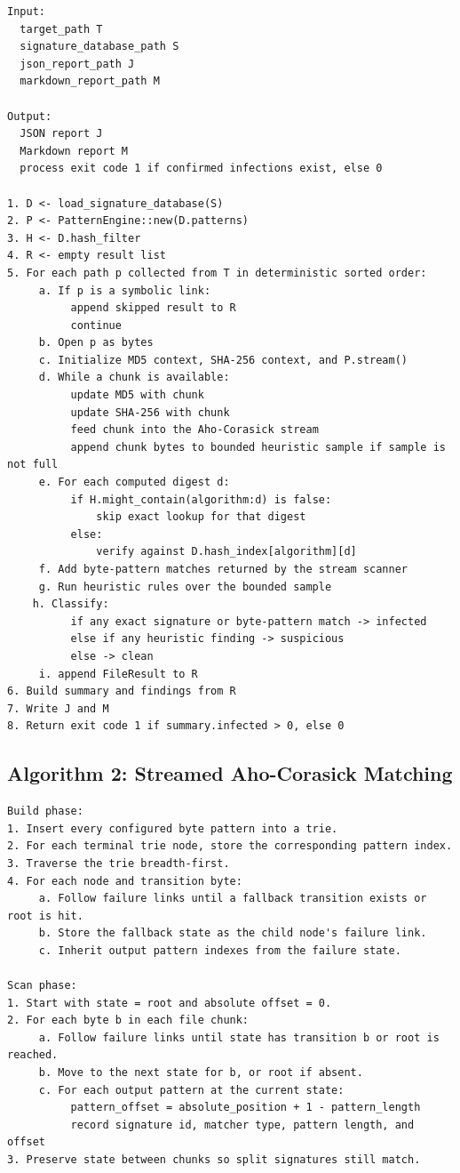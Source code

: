 \documentclass[11pt]{article}
\begin{document}
\begin{lstlisting}[style=sentinel]
Input:
  target_path T
  signature_database_path S
  json_report_path J
  markdown_report_path M

Output:
  JSON report J
  Markdown report M
  process exit code 1 if confirmed infections exist, else 0

1. D <- load_signature_database(S)
2. P <- PatternEngine::new(D.patterns)
3. H <- D.hash_filter
4. R <- empty result list
5. For each path p collected from T in deterministic sorted order:
     a. If p is a symbolic link:
          append skipped result to R
          continue
     b. Open p as bytes
     c. Initialize MD5 context, SHA-256 context, and P.stream()
     d. While a chunk is available:
          update MD5 with chunk
          update SHA-256 with chunk
          feed chunk into the Aho-Corasick stream
          append chunk bytes to bounded heuristic sample if sample is not full
     e. For each computed digest d:
          if H.might_contain(algorithm:d) is false:
              skip exact lookup for that digest
          else:
              verify against D.hash_index[algorithm][d]
     f. Add byte-pattern matches returned by the stream scanner
     g. Run heuristic rules over the bounded sample
    h. Classify:
          if any exact signature or byte-pattern match -> infected
          else if any heuristic finding -> suspicious
          else -> clean
     i. append FileResult to R
6. Build summary and findings from R
7. Write J and M
8. Return exit code 1 if summary.infected > 0, else 0
\end{lstlisting}

\subsection{Algorithm 2: Streamed Aho-Corasick Matching}

\begin{lstlisting}[style=sentinel]
Build phase:
1. Insert every configured byte pattern into a trie.
2. For each terminal trie node, store the corresponding pattern index.
3. Traverse the trie breadth-first.
4. For each node and transition byte:
     a. Follow failure links until a fallback transition exists or root is hit.
     b. Store the fallback state as the child node's failure link.
     c. Inherit output pattern indexes from the failure state.

Scan phase:
1. Start with state = root and absolute offset = 0.
2. For each byte b in each file chunk:
     a. Follow failure links until state has transition b or root is reached.
     b. Move to the next state for b, or root if absent.
     c. For each output pattern at the current state:
          pattern_offset = absolute_position + 1 - pattern_length
          record signature id, matcher type, pattern length, and offset
3. Preserve state between chunks so split signatures still match.
\end{lstlisting}
\end{document}
